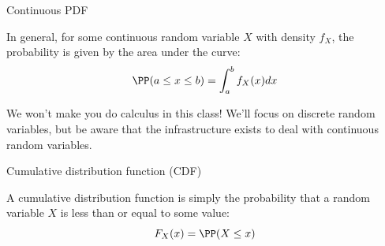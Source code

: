 \begin{frame}{Continuous PDF}

In general, for some continuous random variable $X$ with density $f_X$, the probability is given by the area under the curve:
\begin{equation*}
    \PP (a \leq x \leq b) = \int_a^b f_X(x) dx
\end{equation*}

We won't make you do calculus in this class!  We'll focus on discrete random variables, but be aware that the infrastructure exists to deal with continuous random variables.

\end{frame}

\begin{frame}{Cumulative distribution function (CDF)}

A cumulative distribution function is simply the probability that a random variable $X$ is less than or equal to some value:
\begin{equation*}
    F_X (x) = \PP (X \leq x)
\end{equation*}

\end{frame}


